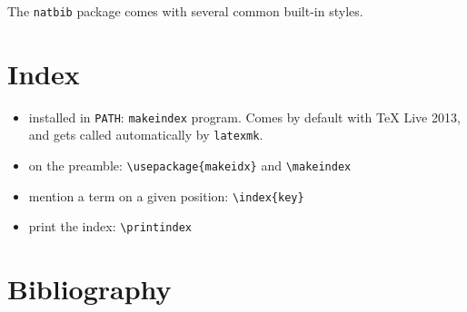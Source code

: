 \documentclass[12pt]{article}
\begin{document}
The \lstinline|natbib| package comes with several common built-in styles.

\section{Index}\label{index}

\begin{itemize}
\item installed in \lstinline|PATH|: \lstinline|makeindex| program. Comes by default with TeX Live 2013, and gets called automatically by \lstinline|latexmk|.
\item on the preamble: \lstinline|\usepackage{makeidx}| and \lstinline|\makeindex|
\item mention a term on a given position: \lstinline|\index{key}|
\item print the index: \lstinline|\printindex|
\end{itemize}


\printindex

\section{Bibliography}\label{secBib}



\end{document}
